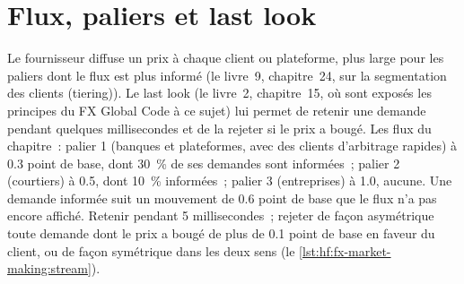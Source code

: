 \section{Flux, paliers et last look}

Le fournisseur diffuse un prix à chaque client ou plateforme, plus large pour les paliers dont le flux est plus informé (le livre~9, chapitre~24,
sur la segmentation des clients (tiering)). Le last look (le livre~2, chapitre~15, où sont exposés les principes du FX Global Code à ce sujet) lui permet
de retenir une demande pendant quelques millisecondes et de la rejeter si le prix a bougé. Les flux du chapitre~: palier 1 (banques et plateformes, avec des clients d'arbitrage rapides) à 0.3 point de
base, dont 30~\% de ses demandes sont informées~; palier 2 (courtiers) à 0.5, dont 10~\% informées~; palier 3 (entreprises) à 1.0, aucune. Une demande informée suit un
mouvement de 0.6 point de base que le flux n'a pas encore affiché. Retenir pendant 5 millisecondes~; rejeter de façon asymétrique toute demande dont le prix a bougé de plus de 0.1 point
de base en faveur du client, ou de façon symétrique dans les deux sens (le \cref{lst:hf:fx-market-making:stream}).


